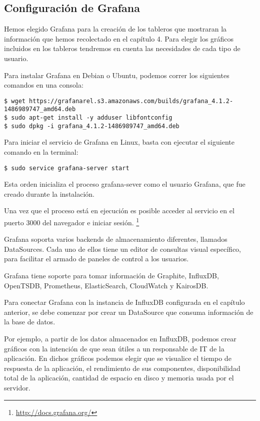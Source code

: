 \subsection{Configuración de Grafana}
\label{configuracion-de-grafana}

Hemos elegido Grafana para la creación de los tableros que mostraran la información que hemos recolectado en el capítulo 4. Para elegir los gráficos incluidos en los tableros tendremos en cuenta las necesidades de cada tipo de usuario.

Para instalar Grafana en Debian o Ubuntu, podemos correr los siguientes comandos en una consola:

\begin{lstlisting}
$ wget https://grafanarel.s3.amazonaws.com/builds/grafana_4.1.2-1486989747_amd64.deb
$ sudo apt-get install -y adduser libfontconfig
$ sudo dpkg -i grafana_4.1.2-1486989747_amd64.deb
\end{lstlisting}

Para iniciar el servicio de Grafana en Linux, basta con ejecutar el siguiente comando en la terminal:

\begin{lstlisting}
$ sudo service grafana-server start
\end{lstlisting}


Esta orden inicializa el proceso grafana-sever como el usuario Grafana, que fue creado durante la instalación.

Una vez que el proceso está en ejecución es posible acceder al servicio en el puerto 3000 del navegador e iniciar sesión. \footnote{\url{http://docs.grafana.org/}}

Grafana soporta varios backends de almacenamiento diferentes, llamados DataSources. Cada uno de ellos tiene un editor de consultas visual específico, para facilitar el armado de paneles de control a los usuarios.

Grafana tiene soporte para tomar información de Graphite, InfluxDB, OpenTSDB, Prometheus, ElasticSearch, CloudWatch y KairosDB.

Para conectar Grafana con la instancia de InfluxDB configurada en el capítulo anterior, se debe comenzar por crear un DataSource que consuma información de la base de datos.



Por ejemplo, a partir de los datos almacenados en InfluxDB, podemos crear gráficos con la intención de que sean útiles a un responsable de IT de la aplicación. En dichos gráficos podemos elegir que se visualice el tiempo de respuesta de la aplicación, el rendimiento de sus componentes, disponibilidad total de la aplicación, cantidad de espacio en disco y memoria usada por el servidor.

